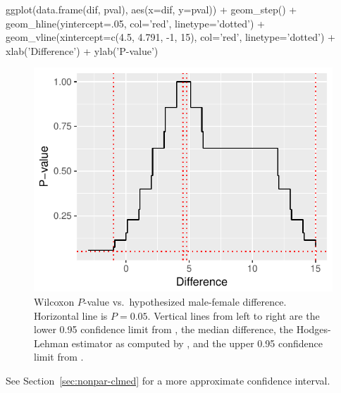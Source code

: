 \begin{Schunk}
\begin{Sinput}
ggplot(data.frame(dif, pval), aes(x=dif, y=pval)) +
  geom_step() +
  geom_hline(yintercept=.05, col='red', linetype='dotted') +
  geom_vline(xintercept=c(4.5, 4.791, -1, 15), col='red', linetype='dotted') +
  xlab('Difference') + ylab('P-value')
\end{Sinput}
\begin{figure}[htbp]

\centerline{\includegraphics{nonpar-checkhl-1} }

\caption[Wilcoxon $P$-value vs.\ hypothesized difference.]{Wilcoxon $P$-value vs.\ hypothesized male-female difference.  Horizontal line is $P=0.05$.  Vertical lines from left to right are the lower 0.95 confidence limit from , the median difference, the Hodges-Lehman estimator as computed by , and the upper 0.95 confidence limit from .}\label{fig:nonpar-checkhl}
\end{figure}
\end{Schunk}
See Section~\ref{sec:nonpar-clmed} for a more approximate confidence interval.

